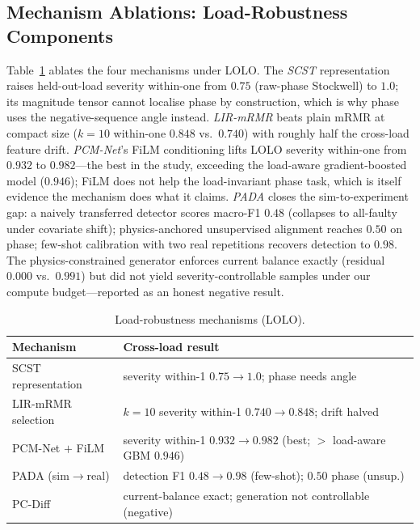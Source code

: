 \documentclass[journal]{IEEEtran}
\begin{document}
\subsection{Mechanism Ablations: Load-Robustness Components}
Table~\ref{tab:mechanisms} ablates the four mechanisms under LOLO. The \emph{SCST}
representation raises held-out-load severity within-one from $0.75$ (raw-phase Stockwell)
to $1.0$; its magnitude tensor cannot localise phase by construction, which is why phase
uses the negative-sequence angle instead. \emph{LIR-mRMR} beats plain mRMR at compact size
($k{=}10$ within-one $0.848$ vs.\ $0.740$) with roughly half the cross-load feature drift.
\emph{PCM-Net}'s FiLM conditioning lifts LOLO severity within-one from $0.932$ to
$\mathbf{0.982}$---the best in the study, exceeding the load-aware gradient-boosted model
($0.946$); FiLM does not help the load-invariant phase task, which is itself evidence the
mechanism does what it claims. \emph{PADA} closes the sim-to-experiment gap: a naively
transferred detector scores macro-F1 $0.48$ (collapses to all-faulty under covariate
shift); physics-anchored unsupervised alignment reaches $0.50$ on phase; few-shot
calibration with two real repetitions recovers detection to $\mathbf{0.98}$. The
physics-constrained generator enforces current balance exactly (residual $0.000$ vs.\
$0.991$) but did not yield severity-controllable samples under our compute
budget---reported as an honest negative result.

\begin{table}[!t]
\caption{Load-robustness mechanisms (LOLO).}
\label{tab:mechanisms}
\centering
\footnotesize
\begin{tabular}{@{}p{}p{}@{}}
\toprule
Mechanism & Cross-load result \\
\midrule
SCST representation & severity within-1 $0.75\!\rightarrow\!1.0$; phase needs angle \\
LIR-mRMR selection & $k{=}10$ severity within-1 $0.740\!\rightarrow\!0.848$; drift halved \\
PCM-Net $+$ FiLM & severity within-1 $0.932\!\rightarrow\!0.982$ (best; $>$ load-aware GBM $0.946$) \\
PADA (sim$\rightarrow$real) & detection F1 $0.48\!\rightarrow\!0.98$ (few-shot); $0.50$ phase (unsup.) \\
PC-Diff & current-balance exact; generation not controllable (negative) \\
\bottomrule
\end{tabular}
\end{table}
\end{document}
